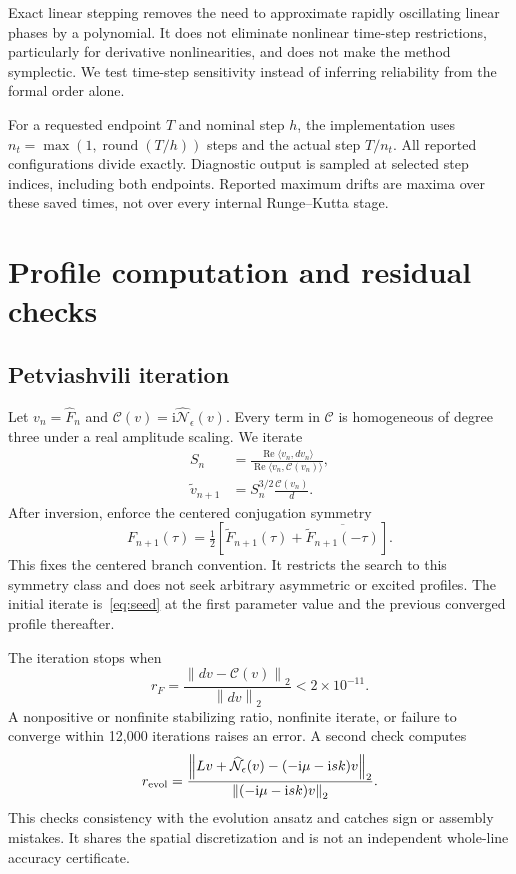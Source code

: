 \documentclass[10pt,letterpaper]{article}
\numberwithin{equation}{section}
\newcommand{\ii}{\mathrm{i}}
\newcommand{\norm}[1]{\left\|#1\right\|}
\begin{document}
Exact linear stepping removes the need to approximate rapidly oscillating linear phases by a polynomial. It does not eliminate nonlinear time-step restrictions, particularly for derivative nonlinearities, and does not make the method symplectic. We test time-step sensitivity instead of inferring reliability from the formal order alone.

For a requested endpoint $T$ and nominal step $h$, the implementation uses $n_t=\max(1,\operatorname{round}(T/h))$ steps and the actual step $T/n_t$. All reported configurations divide exactly. Diagnostic output is sampled at selected step indices, including both endpoints. Reported maximum drifts are maxima over these saved times, not over every internal Runge--Kutta stage.

\section{Profile computation and residual checks}
\subsection{Petviashvili iteration}
Let $v_n=\widehat F_n$ and $\mathcal C(v)=\ii\widehat{\mathcal N}_\epsilon(v)$. Every term in $\mathcal C$ is homogeneous of degree three under a real amplitude scaling. We iterate
\begin{align}
 S_n&=\frac{\operatorname{Re}\langle v_n,dv_n\rangle}
             {\operatorname{Re}\langle v_n,\mathcal C(v_n)\rangle},\\
 \widetilde v_{n+1}&=S_n^{3/2}\frac{\mathcal C(v_n)}{d}.
\end{align}
After inversion, enforce the centered conjugation symmetry
\begin{equation}
 F_{n+1}(\tau)=\tfrac12\left[\widetilde F_{n+1}(\tau)
                      +\overline{\widetilde F_{n+1}(-\tau)}\right].
\end{equation}
This fixes the centered branch convention. It restricts the search to this symmetry class and does not seek arbitrary asymmetric or excited profiles. The initial iterate is~\eqref{eq:seed} at the first parameter value and the previous converged profile thereafter.

The iteration stops when
\begin{equation}\label{eq:residual}
 r_F=\frac{\norm{dv-\mathcal C(v)}_2}{\norm{dv}_2}<2\times10^{-11}.
\end{equation}
A nonpositive or nonfinite stabilizing ratio, nonfinite iterate, or failure to converge within 12,000 iterations raises an error. A second check computes
\begin{equation}
 r_{\rm evol}=\frac{\norm{Lv+\widehat{\mathcal N}_\epsilon(v)
                    -(-\ii\mu-\ii sk)v}_2}
                    {\norm{(-\ii\mu-\ii sk)v}_2}.
\end{equation}
This checks consistency with the evolution ansatz and catches sign or assembly mistakes. It shares the spatial discretization and is not an independent whole-line accuracy certificate.
\end{document}
